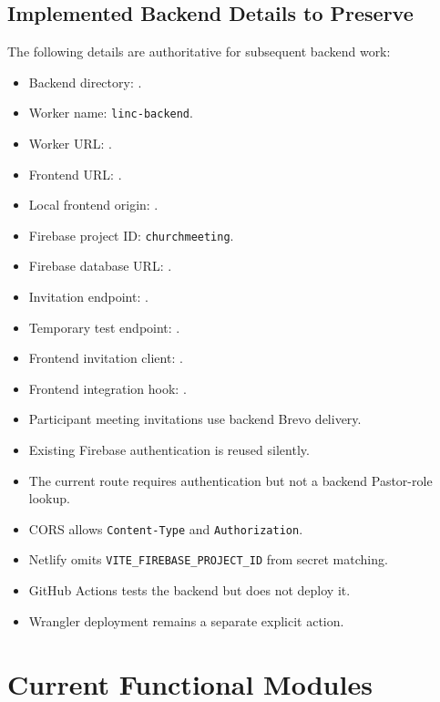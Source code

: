 \documentclass[11pt,a4paper,oneside]{report}
\begin{document}
\section{Implemented Backend Details to Preserve}

The following details are authoritative for subsequent backend work:

\begin{itemize}
  \item Backend directory: .
  \item Worker name: \texttt{linc-backend}.
  \item Worker URL: .
  \item Frontend URL: .
  \item Local frontend origin: .
  \item Firebase project ID: \texttt{churchmeeting}.
  \item Firebase database URL: .
  \item Invitation endpoint: .
  \item Temporary test endpoint: .
  \item Frontend invitation client: .
  \item Frontend integration hook: .
  \item Participant meeting invitations use backend Brevo delivery.
  \item Existing Firebase authentication is reused silently.
  \item The current route requires authentication but not a backend Pastor-role lookup.
  \item CORS allows \texttt{Content-Type} and \texttt{Authorization}.
  \item Netlify omits \texttt{VITE\_FIREBASE\_PROJECT\_ID} from secret matching.
  \item GitHub Actions tests the backend but does not deploy it.
  \item Wrangler deployment remains a separate explicit action.
\end{itemize}


\chapter{Current Functional Modules}
\end{document}
